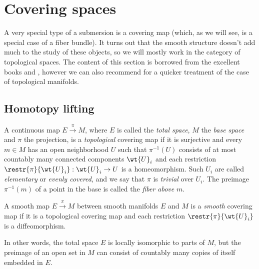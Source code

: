 \clearpage

\chapter{Covering spaces}

A very special type of a submersion is a covering map (which, as we will see, is a special case of a fiber bundle). It turns out that the smooth structure doesn't add much to the study of these objects, so we will mostly work in the category of topological spaces. The content of this section is borrowed from the excellent books \cite{Bredon} and  \cite{tomDieck}, however we can also recommend \cite[Ch.~11]{LeeTop} for a quicker treatment of the case of topological manifolds.


\section{Homotopy lifting}



\begin{defn}
    A continuous map $E\overset{\pi}{\to} M$, where $E$ is called the \emph{total space}, $M$ the \emph{base space} and $\pi$ the projection, is a \emph{topological} covering map if it is surjective and every $m\in M$ has an open neighborhood $U$ such that $\pi^{-1}(U)$ consists of at most countably many connected components $\wt{U}_i$ and each restriction $\restr{\pi}{\wt{U}_i}:\wt{U}_i\to U$ is a homeomorphism. Such $U_i$ are called \emph{elementary} or \emph{evenly covered}, and we say that $\pi$ is \emph{trivial} over $U_i$. The preimage $\pi^{-1}(m)$ of a point in the base is called the \emph{fiber above} $m$.
\end{defn}

\begin{defn}
    A smooth map $E\overset{\pi}{\to} M$ between smooth manifolds $E$ and $M$ is a \emph{smooth} covering map if it is a topological covering map and each restriction $\restr{\pi}{\wt{U}_i}$ is a diffeomorphism.
\end{defn}

In other words, the total space $E$ is locally isomorphic to parts of $M$, but the preimage of an open set in $M$ can consist of countably many copies of itself embedded in $E$.


